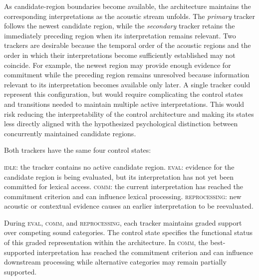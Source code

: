 \documentclass[12pt]{article}
\begin{document}
As candidate-region boundaries become available, the architecture maintains the corresponding interpretations as the acoustic stream unfolds.
%
The \textit{primary} tracker follows the newest candidate region, while the \textit{secondary} tracker retains the immediately preceding region when its interpretation remains relevant.
%
Two trackers are desirable because the temporal order of the acoustic regions and the order in which their interpretations become sufficiently established may not coincide.
%
For example, the newest region may provide enough evidence for commitment while the preceding region remains unresolved because information relevant to its interpretation becomes available only later.
%
A single tracker could represent this configuration, but would require complicating the control states and transitions needed to maintain multiple active interpretations. 
%
This would risk reducing the interpretability of the control architecture and making its states less directly aligned with the hypothesized psychological distinction between concurrently maintained candidate regions.

Both trackers have the same four control states:

\begin{exe}
\ex \begin{xlist}
    \ex \textsc{idle}: the tracker contains no active candidate region.
    \ex \textsc{eval}: evidence for the candidate region is being evaluated, but its interpretation has not yet been committed for lexical access.
    \ex \textsc{comm}: the current interpretation has reached the commitment criterion and can influence lexical processing.
    \ex \textsc{reprocessing}: new acoustic or contextual evidence causes an earlier interpretation to be reevaluated.
\end{xlist}
\end{exe}

During \textsc{eval}, \textsc{comm}, and \textsc{reprocessing}, each tracker maintains graded support over competing sound categories.
%
The control state specifies the functional status of this graded representation within the architecture.
%
In \textsc{comm}, the best-supported interpretation has reached the commitment criterion and can influence downstream processing while alternative categories may remain partially supported.
\end{document}

